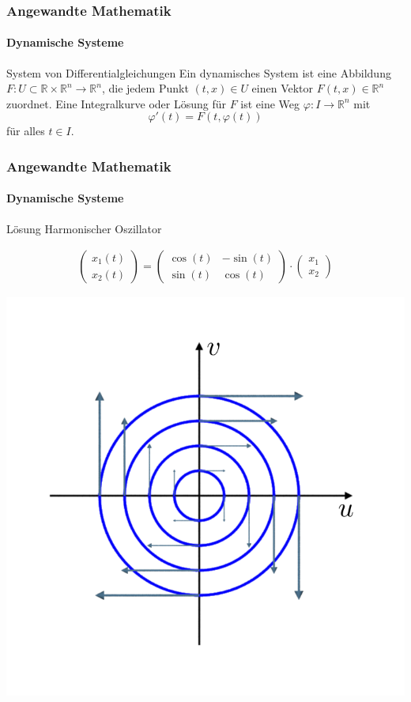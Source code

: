 \documentclass{beamer}
\begin{document}
\begin{frame}
    \frametitle{Angewandte Mathematik}
\framesubtitle{Dynamische Systeme }
\begin{block}{System von Differentialgleichungen}
Ein dynamisches System ist eine  Abbildung $F : U \subset \mathbb{R} \times \mathbb{R}^n \to \mathbb{R}^n$, die jedem Punkt $(t,x)  \in U$ einen Vektor $F(t,x) \in \mathbb{R}^n$ zuordnet. Eine Integralkurve oder Lösung für $F$ ist eine Weg $\varphi : I \to \mathbb{R}^n$ mit 
$$\varphi'(t) = F(t, \varphi(t)) $$
für alles $t \in I$.
\end{block}
 \end{frame}


 \begin{frame}
    \frametitle{Angewandte Mathematik}
\framesubtitle{Dynamische Systeme }

\begin{block}{Lösung Harmonischer Oszillator}
  
    \begin{align*}
        \begin{pmatrix}
            x_1(t) \\ x_2(t)
        \end{pmatrix} = \begin{pmatrix}
            \cos(t) & -\sin(t)  \\ \sin(t) & \cos(t)
        \end{pmatrix}   \cdot \begin{pmatrix}
            x_1\\ x_2
        \end{pmatrix}
    \end{align*}
\end{block}
\center
\includegraphics[scale=0.25]{images/harmonicoszillatorphasespace}
 \end{frame}
\end{document}
